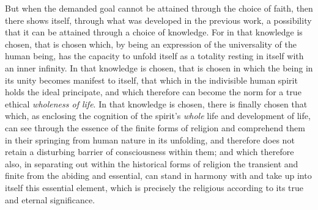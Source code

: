 \documentclass[12pt,a4paper]{book}
\begin{document}
But when the demanded goal cannot be attained through the choice of faith,
then there shows itself, through what was developed in the previous work, a
possibility that it can be attained through a choice of knowledge. For in that
knowledge is chosen, that is chosen which, by being an expression of the
universality of the human being, has the capacity to unfold itself as a
totality resting in itself with an inner infinity. In that knowledge is
chosen, that is chosen in which the being in its unity becomes manifest to
itself, that which in the indivisible human spirit holds the ideal principate,
and which therefore can become the norm for a true ethical \emph{wholeness of
life}. In that knowledge is chosen, there is finally chosen that which, as
enclosing the cognition of the spirit's \emph{whole} life and development of
life, can see through the essence of the finite forms of religion and
comprehend them in their springing from human nature in its unfolding, and
therefore does not retain a disturbing barrier of consciousness within them;
and which therefore also, in separating out within the historical forms of
religion the transient and finite from the abiding and essential, can stand in
harmony with and take up into itself this essential element, which is
precisely the religious according to its true and eternal significance.
\end{document}

